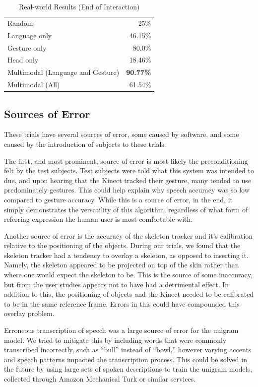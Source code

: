 \documentclass[a4paper, 11pt]{article} %
\begin{document}
\begin{table}
\caption{Real-world Results (End of Interaction)\label{table:end_real}}
\centering
\begin{tabular}{lr}
\toprule
Random & 25\%\\
Language only &  46.15\%\\
Gesture only  &  80.0\%\\
Head only     & 18.46\%\\
Multimodal (Language and Gesture) & {\bf 90.77\%}\\
Multimodal (All) &  61.54\%\\
\bottomrule
\end{tabular}
\end{table}
\subsection{Sources of Error}
These trials have several sources of error, some caused by software, and some caused by the introduction of subjects to these trials.

The first, and most prominent, source of error is most likely the preconditioning felt by the test subjects. Test subjects were told what this system was intended to due, and upon hearing that the Kinect tracked their gesture, many tended to use predominately gestures. This could help explain why speech accuracy was so low compared to gesture accuracy. While this is a source of error, in the end, it simply demonstrates the versatility of this algorithm, regardless of what form of referring expression the human user is most comfortable with.

Another source of error is the accuracy of the skeleton tracker and it's calibration relative to the positioning of the objects. During our trials, we found that the skeleton tracker had a tendency to overlay a skeleton, as opposed to inserting it. Namely, the skeleton appeared to be projected on top of the skin rather than where one would expect the skeleton to be. This is the source of some inaccuracy, but from the user studies appears not to have had a detrimental effect. In addition to this, the positioning of objects and the Kinect needed to be calibrated to be in the same reference frame. Errors in this could have compounded this overlay problem.

Erroneous transcription of speech was a large source of error for the unigram model. We tried to mitigate this by including words that were commonly transcribed incorrectly, such as ``bull'' instead of ``bowl,'' however varying accents and speech patterns impacted the transcription process. This could be solved in the future by using large sets of spoken descriptions to train the unigram models, collected through Amazon Mechanical Turk or similar services.
\end{document}
